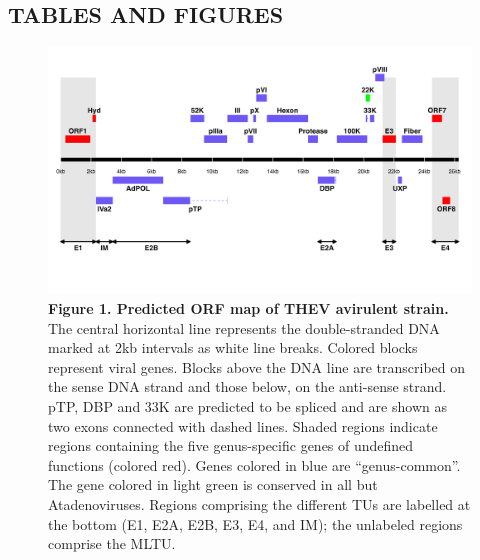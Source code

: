 \documentclass[
]{article}
\begin{document}
\newpage

\subsection{TABLES AND FIGURES}\label{tables-and-figures}

\begin{figure}
\centering
\includegraphics{results/r/figures/figure1.png}
\caption{\textbf{Figure 1. Predicted ORF map of THEV avirulent strain.}
The central horizontal line represents the double-stranded DNA marked at
2kb intervals as white line breaks. Colored blocks represent viral
genes. Blocks above the DNA line are transcribed on the sense DNA strand
and those below, on the anti-sense strand. pTP, DBP and 33K are
predicted to be spliced and are shown as two exons connected with dashed
lines. Shaded regions indicate regions containing the five
genus-specific genes of undefined functions (colored red). Genes colored
in blue are ``genus-common''. The gene colored in light green is
conserved in all but Atadenoviruses. Regions comprising the different
TUs are labelled at the bottom (E1, E2A, E2B, E3, E4, and IM); the
unlabeled regions comprise the MLTU.}
\end{figure}
\end{document}
